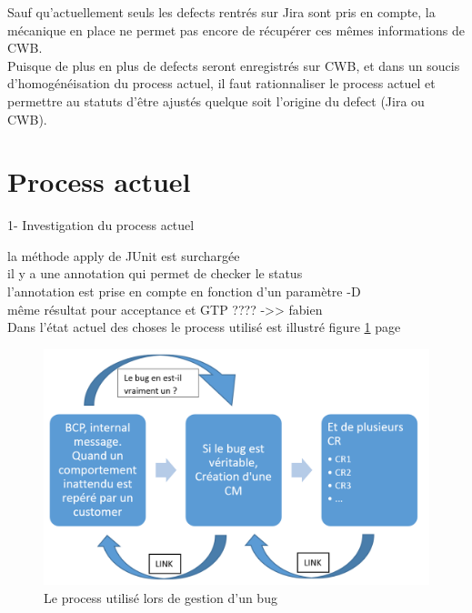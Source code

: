 Sauf qu'actuellement seuls les defects rentrés sur Jira sont pris en compte, la mécanique en place ne permet pas encore de récupérer ces mêmes informations de CWB. \\
Puisque de plus en plus de defects seront enregistrés sur CWB, et dans un soucis d'homogénéisation du process actuel, il faut rationnaliser le process actuel et permettre au statuts d'être ajustés quelque soit l'origine du defect (Jira ou CWB).\\




\section{Process actuel}

1- Investigation du process actuel

la méthode apply de JUnit est surchargée\\
il y a une annotation qui permet de checker le status\\
l'annotation est prise en compte en fonction d'un paramètre -D\\

même résultat pour acceptance et GTP ????   ->> fabien\\

Dans l'état actuel des choses le process utilisé est illustré figure \ref{figure:bugManagementProcess} page \pageref{figure:bugManagementProcess}

\begin{figure}[!h]
  \centering
      \includegraphics[width=\textwidth]{images/bugManagementProcess.png}
  \caption{Le process utilisé lors de gestion d'un bug}
	\label{figure:bugManagementProcess}
\end{figure}





